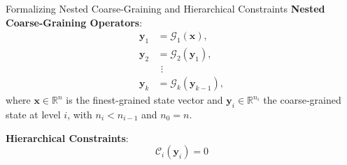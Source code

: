 





\begin{frame}{Formalizing Nested Coarse-Graining and Hierarchical Constraints}
    \textbf{Nested Coarse-Graining Operators}:
    \begin{equation*}
        \begin{aligned}
            \mathbf{y}_1 &= \mathcal{G}_1(\mathbf{x}), \\
            \mathbf{y}_2 &= \mathcal{G}_2(\mathbf{y}_1), \\
            &\ \, \vdots \\
            \mathbf{y}_k &= \mathcal{G}_k(\mathbf{y}_{k-1}),
        \end{aligned}
    \end{equation*}
    where  $\mathbf{x} \in \mathbb{R}^n$ is the finest-grained state vector
        and $\mathbf{y}_i \in \mathbb{R}^{n_i}$ the coarse-grained state at level $i$, with $n_i < n_{i-1}$ and $n_0 = n$.
  
    \vfill 
    
    \textbf{Hierarchical Constraints}:
    $$
        \mathcal{C}_i(\mathbf{y}_i) = 0
    $$
    
\end{frame}


